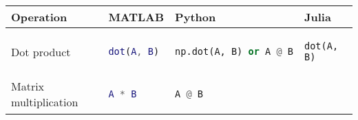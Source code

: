 \documentclass[]{article}
\begin{document}
\begin{longtable}[]{@{}llll@{}}
\toprule
\begin{minipage}[b]{0.23\columnwidth}\raggedright\strut
Operation\strut
\end{minipage} & \begin{minipage}[b]{0.22\columnwidth}\raggedright\strut
MATLAB\strut
\end{minipage} & \begin{minipage}[b]{0.23\columnwidth}\raggedright\strut
Python\strut
\end{minipage} & \begin{minipage}[b]{0.20\columnwidth}\raggedright\strut
Julia\strut
\end{minipage}\tabularnewline
\midrule
\endhead
\begin{minipage}[t]{0.23\columnwidth}\raggedright\strut
Dot product\strut
\end{minipage} & \begin{minipage}[t]{0.22\columnwidth}\raggedright\strut
\begin{lstlisting}[language=Matlab]
dot(A, B)
\end{lstlisting}
\strut
\end{minipage} & \begin{minipage}[t]{0.23\columnwidth}\raggedright\strut
\begin{lstlisting}[language=Python]
np.dot(A, B) or A @ B
\end{lstlisting}
\strut
\end{minipage} & \begin{minipage}[t]{0.20\columnwidth}\raggedright\strut
\begin{lstlisting}
dot(A, B)
\end{lstlisting}
\strut
\end{minipage}\tabularnewline
\begin{minipage}[t]{0.23\columnwidth}\raggedright\strut
Matrix multiplication\strut
\end{minipage} & \begin{minipage}[t]{0.22\columnwidth}\raggedright\strut
\begin{lstlisting}[language=Matlab]
A * B
\end{lstlisting}
\strut
\end{minipage} & \begin{minipage}[t]{0.23\columnwidth}\raggedright\strut
\begin{lstlisting}[language=Python]
A @ B
\end{lstlisting}
\strut
\end{minipage} & \begin{minipage}[t]{0.20\columnwidth}\raggedright\strut

\end{minipage}
\end{longtable}
\end{document}
